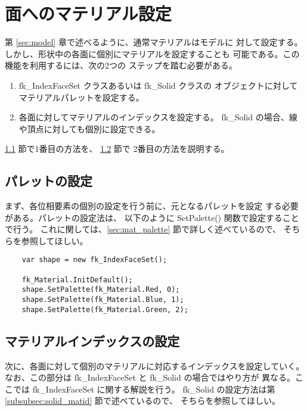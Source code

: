 \section{面へのマテリアル設定} \label{subsec:ifs_mat}
第 \ref{sec:model} 章で述べるように、通常マテリアルはモデルに
対して設定する。しかし、形状中の各面に個別にマテリアルを設定することも
可能である。この機能を利用するには、次の2つの
ステップを踏む必要がある。
\begin{enumerate}
 \item fk\_IndexFaceSet クラスあるいは fk\_Solid クラスの
	オブジェクトに対してマテリアルパレットを設定する。
 \item 各面に対してマテリアルのインデックスを設定する。
	fk\_Solid の場合、線や頂点に対しても個別に設定できる。
\end{enumerate}
\ref{subsubsec:ifs_palette} 節で1番目の方法を、
\ref{subsubsec:ifs_matid} 節で
2番目の方法を説明する。
\subsection{パレットの設定} \label{subsubsec:ifs_palette}
まず、各位相要素の個別の設定を行う前に、元となるパレットを設定
する必要がある。パレットの設定法は、
以下のように SetPalette() 関数で設定することで行う。
これに関しては、\ref{sec:mat_palette} 節で詳しく述べているので、
そちらを参照してほしい。
\\
\begin{breakbox}
\begin{verbatim}
    var shape = new fk_IndexFaceSet();

    fk_Material.InitDefault();
    shape.SetPalette(fk_Material.Red, 0);
    shape.SetPalette(fk_Material.Blue, 1);
    shape.SetPalette(fk_Material.Green, 2);
\end{verbatim}
\end{breakbox}
\subsection{マテリアルインデックスの設定} \label{subsubsec:ifs_matid}
次に、各面に対して個別のマテリアルに対応するインデックスを設定していく。
なお、この部分は fk\_IndexFaceSet と fk\_Solid の場合ではやり方が
異なる。ここでは fk\_IndexFaceSet に関する解説を行う。
fk\_Solid の設定方法は第 \ref{subsubsec:solid_matid} 節で述べているので、
そちらを参照してほしい。


